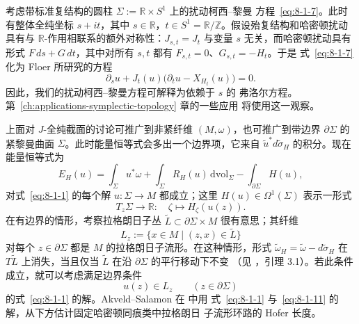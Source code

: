 \begin{remark}[弗洛尔方程]\label{rem:8-1-9}
考虑带标准复结构的圆柱 $\Sigma:=\mathbb R\times S^1$ 上的扰动柯西--黎曼
方程~\eqref{eq:8-1-7}。此时有整体全纯坐标 $s+it$，其中
$s\in\mathbb R$，$t\in S^1=\mathbb R/\mathbb Z$。假设殆复结构和哈密顿扰动具有与
$\mathbb R$-作用相联系的额外对称性：$J_{s,t}=J_t$ 与变量 $s$ 无关，而哈密顿扰动具有
形式 $F\,ds+G\,dt$，其中对所有 $s,t$ 都有 $F_{s,t}=0$、$G_{s,t}=-H_t$。于是
式~\eqref{eq:8-1-7} 化为 Floer 所研究的方程
\[
  \partial_su+J_t(u)\bigl(\partial_tu-X_{H_t}(u)\bigr)=0.
\]
因此，我们的扰动柯西--黎曼方程可解释为依赖于 $s$ 的 弗洛尔方程。第~\ref{ch:applications-symplectic-topology} 章的一些应用
将使用这一观察。
\end{remark}

\begin{remark}[拉格朗日边界条件]\label{rem:8-1-10}
上面对 $J$-全纯截面的讨论可推广到非紧纤维 $(M,\omega)$，也可推广到带边界
$\partial\Sigma$ 的紧黎曼曲面 $\Sigma$。此时能量恒等式会多出一个边界项，它来自
$\widetilde u^*d\widetilde\sigma_H$ 的积分。现在能量恒等式为
\begin{equation}\label{eq:8-1-10}
  E_H(u)=\int_\Sigma u^*\omega
  +\int_\Sigma R_H(u)\,\mathrm{dvol}_\Sigma
  -\int_{\partial\Sigma}H(u),
\end{equation}
对式~\eqref{eq:8-1-1} 的每个解 $u:\Sigma\to M$ 都成立；这里
$H(u)\in\Omega^1(\Sigma)$ 表示一形式
\[
  T_z\Sigma\longrightarrow\mathbb R:\quad
  \zeta\longmapsto H_\zeta(u(z)).
\]
在有边界的情形，考察拉格朗日子丛
$\widetilde L\subset\partial\Sigma\times M$ 很有意思；其纤维
\[
  L_z:=\{x\in M\mid(z,x)\in\widetilde L\}
\]
对每个 $z\in\partial\Sigma$ 都是 $M$ 的拉格朗日子流形。在这种情形，形式
$\widetilde\omega_H=\widetilde\omega-d\widetilde\sigma_H$ 在
$T\widetilde L$ 上消失，当且仅当 $\widetilde L$ 在沿 $\partial\Sigma$ 的平行移动下不变
（见 ，引理 3.1）。若此条件成立，就可以考虑满足边界条件
\begin{equation}\label{eq:8-1-11}
  u(z)\in L_z\qquad(z\in\partial\Sigma)
\end{equation}
的式~\eqref{eq:8-1-1} 的解。Akveld--Salamon 在  中用
式~\eqref{eq:8-1-1} 与~\eqref{eq:8-1-11} 的解，从下方估计固定哈密顿同痕类中拉格朗日
子流形环路的 Hofer 长度。
\end{remark}

